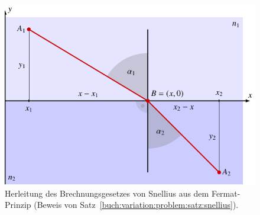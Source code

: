 %
%
%
\begin{figure}
\centering
\includegraphics{chapters/020-variation/images/snellius.pdf}
\caption{Herleitung des Brechnungsgesetzes von Snellius aus dem
Fermat-Prinzip (Beweis von Satz~\ref{buch:variation:problem:satz:snellius}).
\label{buch:variation:problem:fig:snellius}}
\end{figure}
